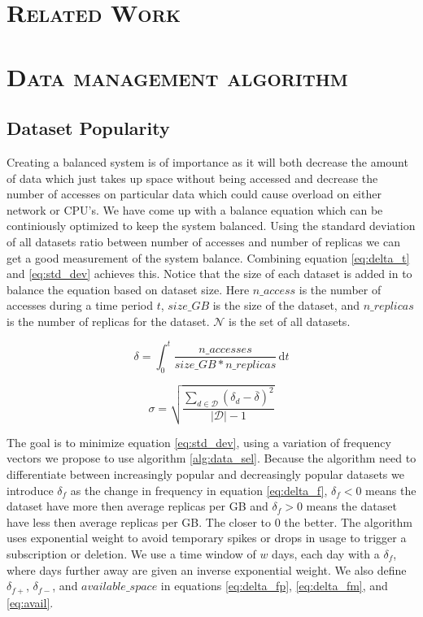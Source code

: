 \documentclass[11pt,a4page]{article}
\begin{document}
\section{\textsc{Related Work}}

  


\section{\textsc{Data management algorithm}}

  \subsection{Dataset Popularity}
    Creating a balanced system is of importance as it will both decrease the amount of data which just takes up space without being accessed and decrease the number of accesses on particular data which could cause overload on either network or CPU's. We have come up with a balance equation which can be continiously optimized to keep the system balanced. Using the standard deviation of all datasets ratio between number of accesses and number of replicas we can get a good measurement of the system balance. Combining equation \ref{eq:delta_t} and \ref{eq:std_dev} achieves this. Notice that the size of each dataset is added in to balance the equation based on dataset size. Here $n\_access$ is the number of accesses during a time period $t$, $size\_GB$ is the size of the dataset, and $n\_replicas$ is the number of replicas for the dataset. $\mathcal{N}$ is the set of all datasets.

    \begin{equation}\label{eq:delta_t}
      \delta = \int_0^t \! \frac{n\_accesses}{size\_GB*n\_replicas} \, \mathrm{d}t
    \end{equation}

    \begin{equation}\label{eq:std_dev}
      \sigma = \sqrt{\frac{\sum\limits_{d \in \mathcal{D}} (\delta_d - \overline{\delta})^2}{|\mathcal{D}| - 1}}
    \end{equation}

    The goal is to minimize equation \ref{eq:std_dev}, using a variation of frequency vectors we propose to use algorithm \ref{alg:data_sel}. Because the algorithm need to differentiate between increasingly popular and decreasingly popular datasets we introduce $\delta_f$ as the change in frequency in equation \ref{eq:delta_f}, $\delta_f < 0$ means the dataset have more then average replicas per GB and $\delta_f > 0$ means the dataset have less then average replicas per GB. The closer to $0$ the better. The algorithm uses exponential weight to avoid temporary spikes or drops in usage to trigger a subscription or deletion. We use a time window of $w$ days, each day with a $\delta_f$, where days further away are given an inverse exponential weight. We also define $\delta_{f+}$, $\delta_{f-}$, and $available\_space$ in equations \ref{eq:delta_fp}, \ref{eq:delta_fm}, and \ref{eq:avail}.
\end{document}
